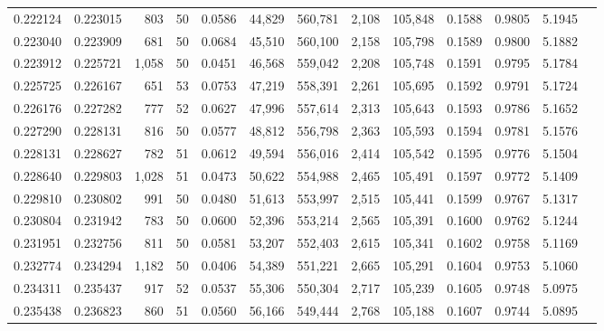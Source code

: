 \begin{tabular}{rrrrrrrrrrrrr}
0.222124 & 0.223015 &   803 &  50 &                                     0.0586 &  44,829 & 560,781 &   2,108 & 105,848 & 0.1588 & 0.9805 & 5.1945 \\
0.223040 & 0.223909 &   681 &  50 &                                     0.0684 &  45,510 & 560,100 &   2,158 & 105,798 & 0.1589 & 0.9800 & 5.1882 \\
0.223912 & 0.225721 & 1,058 &  50 &                                     0.0451 &  46,568 & 559,042 &   2,208 & 105,748 & 0.1591 & 0.9795 & 5.1784 \\
0.225725 & 0.226167 &   651 &  53 &                                     0.0753 &  47,219 & 558,391 &   2,261 & 105,695 & 0.1592 & 0.9791 & 5.1724 \\
0.226176 & 0.227282 &   777 &  52 &                                     0.0627 &  47,996 & 557,614 &   2,313 & 105,643 & 0.1593 & 0.9786 & 5.1652 \\
0.227290 & 0.228131 &   816 &  50 &                                     0.0577 &  48,812 & 556,798 &   2,363 & 105,593 & 0.1594 & 0.9781 & 5.1576 \\
0.228131 & 0.228627 &   782 &  51 &                                     0.0612 &  49,594 & 556,016 &   2,414 & 105,542 & 0.1595 & 0.9776 & 5.1504 \\
0.228640 & 0.229803 & 1,028 &  51 &                                     0.0473 &  50,622 & 554,988 &   2,465 & 105,491 & 0.1597 & 0.9772 & 5.1409 \\
0.229810 & 0.230802 &   991 &  50 &                                     0.0480 &  51,613 & 553,997 &   2,515 & 105,441 & 0.1599 & 0.9767 & 5.1317 \\
0.230804 & 0.231942 &   783 &  50 &                                     0.0600 &  52,396 & 553,214 &   2,565 & 105,391 & 0.1600 & 0.9762 & 5.1244 \\
0.231951 & 0.232756 &   811 &  50 &                                     0.0581 &  53,207 & 552,403 &   2,615 & 105,341 & 0.1602 & 0.9758 & 5.1169 \\
0.232774 & 0.234294 & 1,182 &  50 &                                     0.0406 &  54,389 & 551,221 &   2,665 & 105,291 & 0.1604 & 0.9753 & 5.1060 \\
0.234311 & 0.235437 &   917 &  52 &                                     0.0537 &  55,306 & 550,304 &   2,717 & 105,239 & 0.1605 & 0.9748 & 5.0975 \\
0.235438 & 0.236823 &   860 &  51 &                                     0.0560 &  56,166 & 549,444 &   2,768 & 105,188 & 0.1607 & 0.9744 & 5.0895 \\

\end{tabular}
